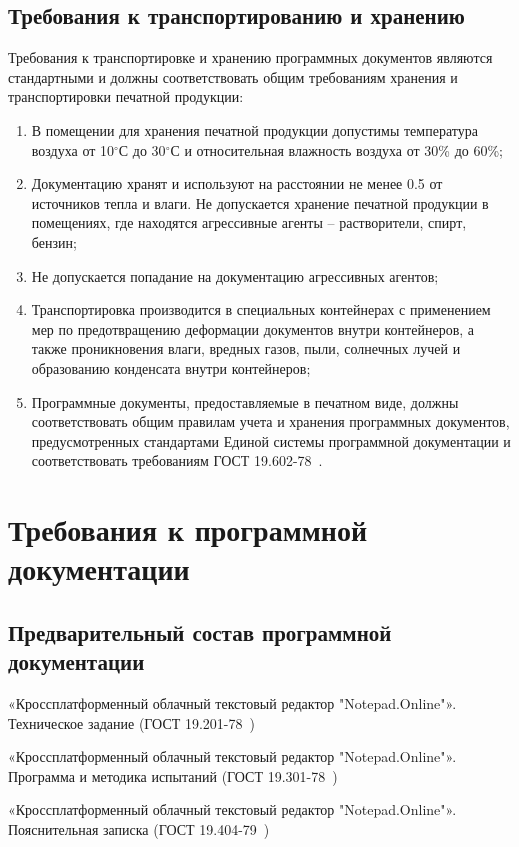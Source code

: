 \subsection{Требования к транспортированию и хранению}
Требования к транспортировке и хранению программных документов являются стандартными и должны соответствовать общим требованиям хранения и транспортировки печатной продукции:

\begin{enumerate}
\item В помещении для хранения печатной продукции допустимы температура воздуха от 10$^\circ$С до 30$^\circ$С и относительная влажность воздуха от 30\% до 60\%;
\item Документацию хранят и используют на расстоянии не менее 0.5 от источников тепла и влаги. Не допускается хранение печатной продукции в помещениях, где находятся агрессивные агенты – растворители, спирт, бензин;
\item Не допускается попадание на документацию агрессивных агентов;
\item Транспортировка производится в специальных контейнерах с применением мер по предотвращению деформации документов внутри контейнеров, а также проникновения влаги, вредных газов, пыли, солнечных лучей и образованию конденсата внутри контейнеров;
\item Программные документы, предоставляемые в печатном виде, должны соответствовать общим правилам учета и хранения программных документов, предусмотренных стандартами Единой системы программной документации и соответствовать требованиям ГОСТ 19.602-78~\cite{espd602}.
\end{enumerate}

\section{Требования к программной документации}

\subsection{Предварительный состав программной документации}\label{subsection:documentation}
«Кроссплатформенный облачный текстовый редактор "Notepad.Online"». Техническое задание (ГОСТ 19.201-78~\cite{espd201})

«Кроссплатформенный облачный текстовый редактор "Notepad.Online"». Программа и методика испытаний (ГОСТ 19.301-78~\cite{espd301})

«Кроссплатформенный облачный текстовый редактор "Notepad.Online"». Пояснительная записка (ГОСТ 19.404-79~\cite{espd404})

